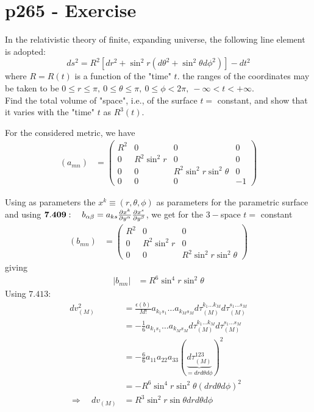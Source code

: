 \section{p265 - Exercise}
\begin{tcolorbox}
In the relativistic theory of finite, expanding universe, the following line element is adopted:
$$ds^2=R^2\left[dr^2+\sin^2 r\left(d\theta^2+\sin^2\theta d\phi^2\right)\right]-dt^2$$
where $R=R(t)$ is a function of the "time" $t$. the ranges of the coordinates may be taken to be $0\leq r\leq \pi, \ 0 \leq \theta \leq \pi,\ 0 \leq \phi< 2\pi,\ -\infty < t < + \infty$.\\
Find the total volume of "space", i.e., of the surface $t=$ constant, and show that it varies with the "time" $t$ as $R^3(t)$.
\end{tcolorbox}
For the considered metric, we have
\begin{align}
\left(a_{mn}\right)&= \left(\begin{array}{llll}
R^2&0&0&0\\
0&R^2\sin^2r&0&0\\
0&0&R^2\sin^2 r\sin^2\theta&0\\
0&0&0&-1
\end{array}\right)
\end{align}

Using as parameters the $x^k \equiv(r,\theta,\phi)$ as parameters for the parametric surface and using $\mathbf{7.409}:\quad b_{\alpha\beta}= a_{ks}\pdv{x^k}{y^{\alpha}}\pdv{x^s}{y^{\beta}} $, we get for the $3-$space $t=$ constant
\begin{align}
\left(b_{mn}\right)&= \left(\begin{array}{lll}
R^2&0&0\\
0&R^2\sin^2r&0\\
0&0&R^2\sin^2 r\sin^2\theta
\end{array}\right)
\end{align}
giving 
\begin{align}
\left|b_{mn}\right| &= R^6\sin^4 r\sin^2\theta
\end{align}
Using $\mathbf{7.413}$:
\begin{align}
dv_{(M)}^2&= \frac{\epsilon (b)}{M!}a_{k_1s_1}\dots a_{k_M s_M}d\tau_{(M)}^{k_1\dots k_M}d\tau_{(M)}^{s_1\dots s_M}\\
&= -\frac{1}{6}a_{k_1s_1}\dots a_{k_M s_M}d\tau_{(M)}^{k_1\dots k_M}d\tau_{(M)}^{s_1\dots s_M}\\
&= -\frac{6}{6}a_{11}a_{22}a_{33}\left(\underbrace{d\tau_{(M)}^{123}}_{=dr d\theta d\phi} \right)^2\\
&= -R^6\sin^4 r\sin^2\theta\left(dr d\theta d\phi \right)^2\\
\Rightarrow \quad dv_{(M)}&=R^3\sin^2 r\sin\theta dr d\theta d\phi
\end{align}


